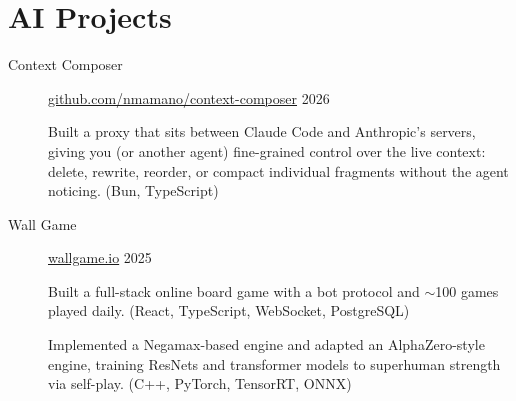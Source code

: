 \documentclass[letterpaper,10pt,oneside]{article}
\begin{document}
\section*{AI Projects}
\begin{description}
	\item[Context Composer]\quad \href{https://github.com/nmamano/context-composer}{github.com/nmamano/context-composer} \hfill 2026

	\noindent\llap{\textbullet\hspace{6pt}}Built a proxy that sits between Claude Code and Anthropic's servers, giving you (or another agent) fine-grained control over the live context: delete, rewrite, reorder, or compact individual fragments without the agent noticing. (Bun, TypeScript)

	\item[Wall Game]\quad \href{https://wallgame.io}{wallgame.io} \hfill 2025

	\noindent\llap{\textbullet\hspace{6pt}}Built a full-stack online board game with a bot protocol and $\sim$100 games played daily. (React, TypeScript, WebSocket, PostgreSQL)

	\vspace{2px}
	\noindent\llap{\textbullet\hspace{6pt}}Implemented a Negamax-based engine and adapted an AlphaZero-style engine, training ResNets and transformer models to superhuman strength via self-play. (C++, PyTorch, TensorRT, ONNX)

\end{description}
\end{document}
